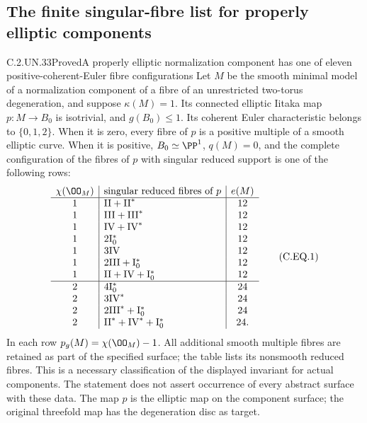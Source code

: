 \subsection{The finite singular-fibre list for properly elliptic components}

\begin{statement}{C.2.UN.33}{Proved}{A properly elliptic normalization component has one of eleven positive-coherent-Euler fibre configurations}
Let $M$ be the smooth minimal model of a normalization
component of a fibre of an unrestricted two-torus degeneration,
and suppose $\kappa(M)=1$. Its connected elliptic Iitaka map
$p:M\to B_0$ is isotrivial, and $g(B_0)\le1$.
Its coherent Euler characteristic belongs to $\{0,1,2\}$.
When it is zero, every fibre of $p$ is a positive multiple
of a smooth elliptic curve. When it is positive,
$B_0\simeq\PP^1$, $q(M)=0$, and the complete configuration
of the fibres of $p$ with singular reduced support is one
of the following rows:
\[
\begin{array}{c|l|c}
\chi(\OO_M)&\text{singular reduced fibres of }p&e(M)\\ \hline
1&\mathrm{II}+\mathrm{II}^*&12\\
1&\mathrm{III}+\mathrm{III}^*&12\\
1&\mathrm{IV}+\mathrm{IV}^*&12\\
1&2\mathrm I_0^*&12\\
1&3\mathrm{IV}&12\\
1&2\mathrm{III}+\mathrm I_0^*&12\\
1&\mathrm{II}+\mathrm{IV}+\mathrm I_0^*&12\\ \hline
2&4\mathrm I_0^*&24\\
2&3\mathrm{IV}^*&24\\
2&2\mathrm{III}^*+\mathrm I_0^*&24\\
2&\mathrm{II}^*+\mathrm{IV}^*+\mathrm I_0^*&24 .
\end{array}                                                   \tag{C.EQ.1}
\]
In each row $p_g(M)=\chi(\OO_M)-1$. All additional
smooth multiple fibres are retained as part of the specified
surface; the table lists its nonsmooth reduced fibres.
This is a necessary classification of the displayed
invariant for actual components. The statement does not
assert occurrence of every abstract surface with these data.
The map $p$ is the elliptic map on the component surface;
the original threefold map has the degeneration disc as target.
\end{statement}

